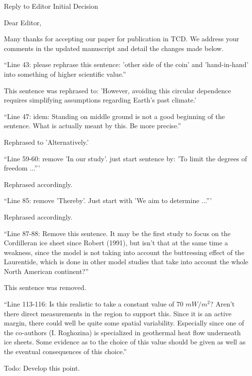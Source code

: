 \documentclass{letter}
\newcommand{\rev}[0]{\color{blue!50!black}\it}
\newcommand{\revpoint}[1]{{\rev\item``#1''}}
\newcommand{\todo}[1]{\textcolor{red!50!black}{Todo: #1}}
\begin{document}
\begin{letter}{Reply to Editor Initial Decision}

\opening{Dear Editor,}

Many thanks for accepting our paper for publication in TCD. We address your comments in the updated manuscript and detail the changes made below.


\begin{itemize}

\revpoint{Line 43: please rephrase this sentence: 'other side of the coin' and 'hand-in-hand' into something of higher scientific value.}

This sentence was rephrased to: 'However, avoiding this circular dependence requires simplifying assumptions regarding Earth's past climate.'

\revpoint{Line 47: idem: Standing on middle ground is not a good beginning of the sentence. What is actually meant by this. Be more precise.}

Rephrased to 'Alternatively.'

\revpoint{Line 59-60: remove 'In our study'. just start sentence by: 'To limit the degrees of freedom ...'}

Rephrased accordingly.

\revpoint{Line 85: remove 'Thereby'. Just start with 'We aim to determine ...'}

Rephrased accordingly.

\revpoint{Line 87-88: Remove this sentence. It may be the first study to focus on the Cordilleran ice sheet since Robert (1991), but isn't that at the same time a weakness, since the model is not taking into account the buttressing effect of the Laurentide, which is done in other model studies that take into account the whole North American continent?}

This sentence was removed.

\revpoint{Line 113-116: Is this realistic to take a constant value of 70 $mW/m^2$? Aren't there direct measurements in the region to support this. Since it is an active margin, there could well be quite some spatial variability. Especially since one of the co-authors (I. Roghozina) is specialized in geothermal heat flow underneath ice sheets. Some evidence as to the choice of this value should be given as well as the eventual consequences of this choice.}

\todo{Develop this point.}


\end{itemize}
\end{letter}
\end{document}
